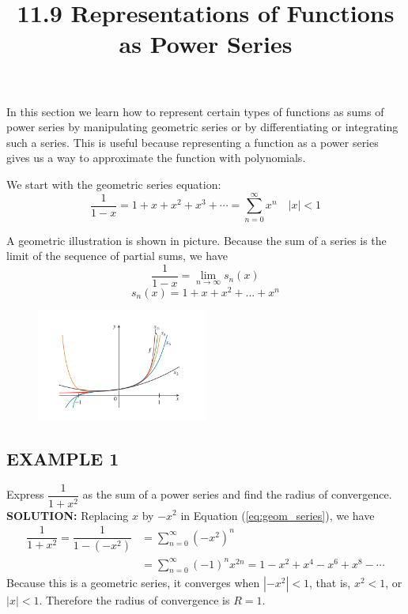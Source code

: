\documentclass{article}
\title{11.9 Representations of Functions as Power Series}
\date{}
\author{}
\theoremstyle{mystyle}
\begin{document}
\maketitle

In this section we learn how to represent certain types of functions as sums of power series by manipulating geometric series or by differentiating or integrating such a series. This is useful because representing a function as a power series gives us a way to approximate the function with polynomials.


We start with the geometric series equation:
\begin{equation*}
    \frac{1}{1-x} = 1 + x + x^2 + x^3 + \cdots = \sum_{n=0}^{\infty} x^n \quad |x| < 1 \label{eq:geom_series}
\end{equation*}

A geometric illustration is shown in picture. Because the sum of a series is the limit of the sequence of partial sums, we have
    \[\frac{1}{1-x} = \lim_{n\to\infty} s_n(x)\]
    \[s_n(x) = 1+x+x^2+...+x^n\]

\begin{figure}[htbp]

    \centering
    \includegraphics[width=0.5\textwidth]{graph 78.png}
\end{figure}

\subsection*{EXAMPLE 1}
Express \( \dfrac{1}{1+x^2} \) as the sum of a power series and find the radius of convergence.\\
\textbf{SOLUTION:}
Replacing \(x\) by \(-x^2\) in Equation (\ref{eq:geom_series}), we have
\begin{align*}
    \dfrac{1}{1+x^2} = \dfrac{1}{1-(-x^2)} &= \sum_{n=0}^{\infty} (-x^2)^n \\
    &= \sum_{n=0}^{\infty} (-1)^n x^{2n} = 1 - x^2 + x^4 - x^6 + x^8 - \cdots
\end{align*}
Because this is a geometric series, it converges when \(|-x^2| < 1\), that is, \(x^2 < 1\), or \(|x| < 1\). Therefore the radius of convergence is \(R=1\).
\end{document}
